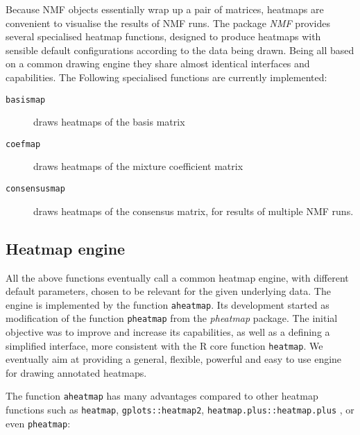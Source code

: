 \documentclass[a4paper]{article}\usepackage{graphicx, color}
\let\code=\texttt
\newcommand{\pkgname}[1]{\textit{#1}\xspace}
\newcommand{\nmfpack}{\pkgname{NMF}}
\begin{document}
Because NMF objects essentially wrap up a pair of matrices, heatmaps are convenient 
to visualise the results of NMF runs. 
The package \nmfpack provides several specialised heatmap functions, designed to produce 
heatmaps with sensible default configurations according to the data being drawn.
Being all based on a common drawing engine they share almost identical interfaces 
and capabilities.
The Following specialised functions are currently implemented:

\begin{description}
\item[\code{basismap}] draws heatmaps of the basis matrix 
\item[\code{coefmap}] draws heatmaps of the mixture coefficient matrix
\item[\code{consensusmap}] draws heatmaps of the consensus matrix, for results 
of multiple NMF runs.
\end{description}

\subsection{Heatmap engine}

All the above functions eventually call a common heatmap engine, with 
different default parameters, chosen to be relevant for the given underlying data.
The engine is implemented by the function \code{aheatmap}. 
Its development started as modification of the function \code{pheatmap} from 
the \pkgname{pheatmap} package. 
The initial objective was to improve and increase its capabilities, as well as 
a defining a simplified interface, more consistent with the R core function \code{heatmap}.
We eventually aim at providing a general, flexible, powerful and easy to use engine 
for drawing annotated heatmaps.
  
The function \code{aheatmap} has many advantages compared to other heatmap functions 
such as \code{heatmap}, \code{gplots::heatmap2}, \code{heatmap.plus::heatmap.plus} 
, or even \code{pheatmap}:
\end{document}
